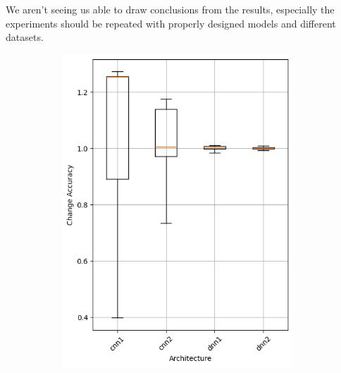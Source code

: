 We aren't seeing us able to draw conclusions from the results, especially the experiments should be repeated with properly designed models and different datasets.
\begin{figure}
    \begin{subfigure}{0.5\textwidth}
        \centering
        \includegraphics[width=0.95\textwidth]{plots/Architecture_NotTrained_accuracy.png}
    \end{subfigure}
    \begin{subfigure}{0.5\textwidth}
        \centering

\end{subfigure}
\end{figure}
